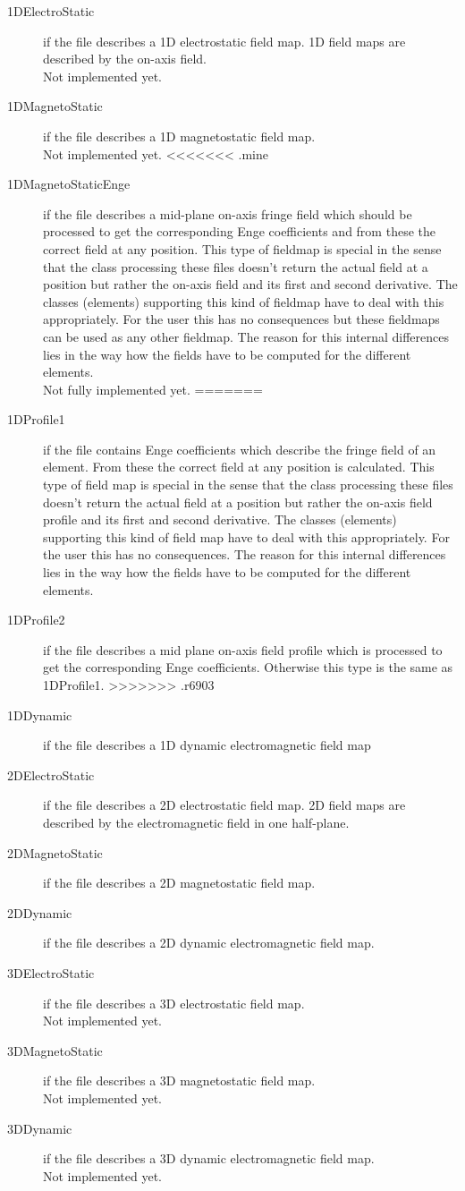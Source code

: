 \begin{description}
\item[1DElectroStatic]
if the file describes a 1D electrostatic field map. 1D field maps are described by the on-axis field.\\
Not implemented yet.
\item[1DMagnetoStatic]
if the file describes a 1D magnetostatic field map.\\
Not implemented yet.
<<<<<<< .mine
\item[1DMagnetoStaticEnge]
if the file describes a mid-plane on-axis fringe field which should be processed to get the corresponding Enge coefficients and from these the correct field at any position. This type of fieldmap is special in the sense that the class processing these files doesn't return the actual field at a position but rather the on-axis field and its first and second derivative. The classes (elements) supporting this kind of fieldmap have to deal with this appropriately. For the user this has no consequences but these fieldmaps can be used as any other fieldmap. The reason for this internal differences lies in the way how the fields have to be computed for the different elements.\\
Not fully implemented yet.
=======
\item[1DProfile1]
if the file contains Enge coefficients which describe the fringe field of an element. From these the correct field at any position is calculated. This type of field map is special in the sense that the class processing these files doesn't return the actual field at a position but rather the on-axis field profile and its first and second derivative. The classes (elements) supporting this kind of field map have to deal with this appropriately. For the user this has no consequences. The reason for this internal differences lies in the way how the fields have to be computed for the different elements.
\item[1DProfile2]
if the file describes a mid plane on-axis field profile which is processed to get the corresponding Enge coefficients. Otherwise this type is the same as 1DProfile1. 
>>>>>>> .r6903
\item[1DDynamic]
if the file describes a 1D dynamic electromagnetic field map
\item[2DElectroStatic]
if the file describes a 2D electrostatic field map. 2D field maps are described by the electromagnetic field in one half-plane.
\item[2DMagnetoStatic]
if the file describes a 2D magnetostatic field map.
\item[2DDynamic]
if the file describes a 2D dynamic electromagnetic field map.
\item[3DElectroStatic]
if the file describes a 3D electrostatic field map.\\
Not implemented yet.
\item[3DMagnetoStatic]
if the file describes a 3D magnetostatic field map.\\
Not implemented yet.
\item[3DDynamic]
if the file describes a 3D dynamic electromagnetic field map.\\
Not implemented yet.
\end{description}

